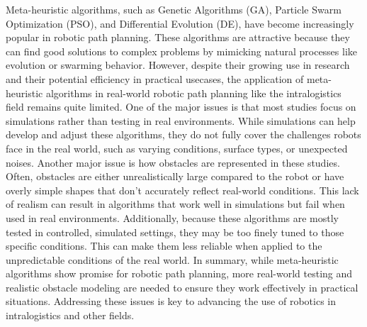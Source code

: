Meta-heuristic algorithms, such as Genetic Algorithms (GA), Particle Swarm Optimization (PSO), and Differential 
Evolution (DE), have become increasingly popular in robotic path planning. These algorithms are attractive because 
they can find good solutions to complex problems by mimicking natural processes like evolution or swarming behavior.
However, despite their growing use in research and their potential efficiency in practical usecases, the application 
of meta-heuristic algorithms in real-world robotic path planning like the intralogistics field remains quite limited. 
One of the major issues is that most studies focus on simulations rather than 
testing in real environments. While simulations can help develop and adjust these algorithms, they do not fully 
cover the challenges robots face in the real world, such as varying conditions, surface types, or unexpected 
noises. Another major issue is how obstacles are represented in these studies. Often, obstacles are either unrealistically 
large compared to the robot or have overly simple shapes that don’t accurately reflect real-world conditions. This 
lack of realism can result in algorithms that work well in simulations but fail when used in real environments. Additionally, 
because these algorithms are mostly tested in controlled, simulated settings, they may be too finely 
tuned to those specific conditions. This can make them less reliable when applied to the unpredictable conditions 
of the real world. In summary, while meta-heuristic algorithms show promise for robotic path planning, more real-world 
testing and realistic obstacle modeling are needed to ensure they work effectively in practical situations. 
Addressing these issues is key to advancing the use of robotics in intralogistics and other fields.
\newpage
